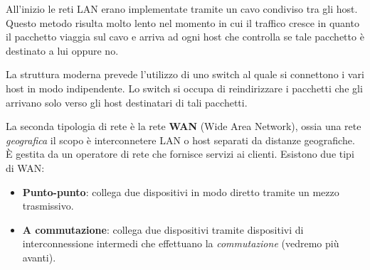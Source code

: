 All'inizio le reti LAN erano implementate tramite un cavo condiviso tra gli host. Questo metodo 
risulta molto lento nel momento in cui il traffico cresce in quanto il pacchetto viaggia sul cavo
e arriva ad ogni host che controlla se tale pacchetto è destinato a lui oppure no.

La struttura moderna prevede l'utilizzo di uno switch al quale si connettono i vari host in modo 
indipendente. Lo switch si occupa di reindirizzare i pacchetti che gli arrivano solo verso gli 
host destinatari di tali pacchetti.

La seconda tipologia di rete è la rete \textbf{WAN} (Wide Area Network), ossia una rete
\emph{geografica} il scopo è interconnetere LAN o host separati da distanze geografiche. \`E
gestita da un operatore di rete che fornisce servizi ai clienti. Esistono due tipi di WAN:
\begin{itemize}
	\item \textbf{Punto-punto}: collega due dispositivi in modo diretto tramite un mezzo
		trasmissivo.
	\item \textbf{A commutazione}: collega due dispositivi tramite dispositivi di interconnessione
		intermedi che effettuano la \emph{commutazione} (vedremo più avanti).
\end{itemize}
